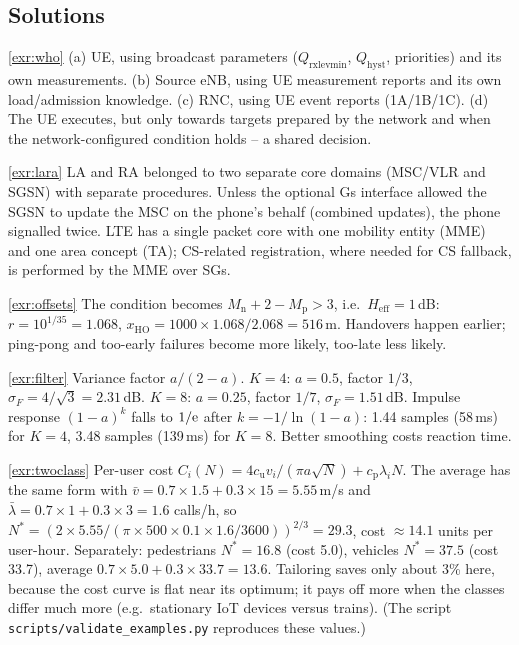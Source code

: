 \documentclass[11pt,a4paper]{article}
\begin{document}
\subsection*{Solutions}

\begin{solutionbox}{\ref{exr:who}}
(a) UE, using broadcast parameters ($Q_{\mathrm{rxlevmin}}$, $Q_{\mathrm{hyst}}$, priorities) and its own
measurements. (b) Source eNB, using UE measurement reports and its own load/admission knowledge.
(c) RNC, using UE event reports (1A/1B/1C). (d) The UE executes, but only towards targets prepared by
the network and when the network-configured condition holds -- a shared decision.
\end{solutionbox}

\begin{solutionbox}{\ref{exr:lara}}
LA and RA belonged to two separate core domains (MSC/VLR and SGSN) with separate procedures. Unless
the optional Gs interface allowed the SGSN to update the MSC on the phone's behalf (combined
updates), the phone signalled twice. LTE has a single packet core with one mobility entity (MME)
and one area concept (TA); CS-related registration, where needed for CS fallback, is performed by
the MME over SGs.
\end{solutionbox}

\begin{solutionbox}{\ref{exr:offsets}}
The condition becomes $M_\mathrm{n} + 2 - M_\mathrm{p} > 3$, i.e.\ $H_{\mathrm{eff}} = 1$\,dB:
$r = 10^{1/35} = 1.068$, $x_{\mathrm{HO}} = 1000\times1.068/2.068 = 516$\,m. Handovers happen earlier;
ping-pong and too-early failures become more likely, too-late less likely.
\end{solutionbox}

\begin{solutionbox}{\ref{exr:filter}}
Variance factor $a/(2-a)$. $K=4$: $a=0.5$, factor $1/3$, $\sigma_F = 4/\sqrt3 = 2.31$\,dB.
$K=8$: $a = 0.25$, factor $1/7$, $\sigma_F = 1.51$\,dB. Impulse response $(1-a)^k$ falls to
$1/\mathrm{e}$ after $k = -1/\ln(1-a)$: 1.44 samples (58\,ms) for $K=4$, 3.48 samples (139\,ms) for $K=8$.
Better smoothing costs reaction time.
\end{solutionbox}

\begin{solutionbox}{\ref{exr:twoclass}}
Per-user cost $C_i(N) = 4c_\mathrm{u}v_i/(\pi a\sqrt N) + c_\mathrm{p}\lambda_iN$. The average has the same
form with $\bar v = 0.7\times1.5+0.3\times15 = 5.55$\,m/s and $\bar\lambda = 0.7\times1+0.3\times3 =
1.6$ calls/h, so $N^\ast = (2\times5.55/(\pi\times500\times0.1\times1.6/3600))^{2/3} = 29.3$, cost
$\approx 14.1$ units per user-hour. Separately: pedestrians $N^\ast = 16.8$ (cost 5.0), vehicles
$N^\ast = 37.5$ (cost 33.7), average $0.7\times5.0+0.3\times33.7 = 13.6$. Tailoring saves only about
3\% here, because the cost curve is flat near its optimum; it pays off more when the classes differ
much more (e.g.\ stationary IoT devices versus trains).
(The script \texttt{scripts/validate\_examples.py} reproduces these values.)
\end{solutionbox}
\end{document}

